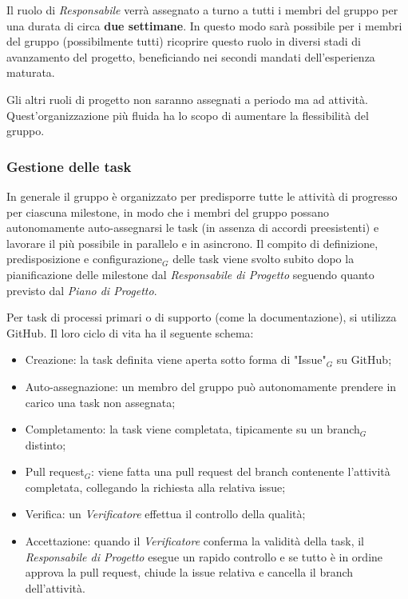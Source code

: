 Il ruolo di \textit{Responsabile} verrà assegnato a turno a tutti i membri del gruppo per una durata di circa \textbf{due settimane}. In questo modo sarà possibile per i membri del gruppo (possibilmente tutti) ricoprire questo ruolo in diversi stadi di avanzamento del progetto, beneficiando nei secondi mandati dell'esperienza maturata.

Gli altri ruoli di progetto non saranno assegnati a periodo ma ad attività. Quest'organizzazione più fluida ha lo scopo di aumentare la flessibilità del gruppo.

\subsubsection{Gestione delle task}
In generale il gruppo è organizzato per predisporre tutte le attività di progresso per ciascuna milestone, in modo che i membri del gruppo possano autonomamente auto-assegnarsi le task (in assenza di accordi preesistenti) e lavorare il più possibile in parallelo e in asincrono. Il compito di definizione, predisposizione e configurazione$_G$ delle task viene svolto subito dopo la pianificazione delle milestone dal \textit{Responsabile di Progetto} seguendo quanto previsto dal \textit{Piano di Progetto}.

Per task di processi primari o di supporto (come la documentazione), si utilizza GitHub. Il loro ciclo di vita ha il seguente schema:
\begin{itemize}
  \item Creazione: la task definita viene aperta sotto forma di "Issue"$_G$ su GitHub;
  \item Auto-assegnazione: un membro del gruppo può autonomamente prendere in carico una task non assegnata;
  \item Completamento: la task viene completata, tipicamente su un branch$_G$ distinto;
  \item Pull request$_G$: viene fatta una pull request del branch contenente l'attività completata, collegando la richiesta alla relativa issue;
  \item Verifica: un \textit{Verificatore} effettua il controllo della qualità;
  \item Accettazione: quando il \textit{Verificatore} conferma la validità della task, il \textit{Responsabile di Progetto} esegue un rapido controllo e se tutto è in ordine approva la pull request, chiude la issue relativa e cancella il branch dell'attività.
\end{itemize}

